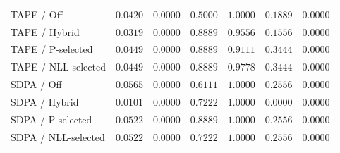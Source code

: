 \begin{table}[tb]
\begin{tabular}{l*{6}{r}}
\addlinespace[3pt]
TAPE / Off & $0.0420$ & $0.0000$ & $0.5000$ & $1.0000$ & $0.1889$ & $0.0000$ \\
TAPE / Hybrid & $0.0319$ & $0.0000$ & $0.8889$ & $0.9556$ & $0.1556$ & $0.0000$ \\
TAPE / P-selected & $0.0449$ & $0.0000$ & $0.8889$ & $0.9111$ & $0.3444$ & $0.0000$ \\
TAPE / NLL-selected & $0.0449$ & $0.0000$ & $0.8889$ & $0.9778$ & $0.3444$ & $0.0000$ \\
\addlinespace[3pt]
SDPA / Off & $0.0565$ & $0.0000$ & $0.6111$ & $1.0000$ & $0.2556$ & $0.0000$ \\
SDPA / Hybrid & $0.0101$ & $0.0000$ & $0.7222$ & $1.0000$ & $0.0000$ & $0.0000$ \\
SDPA / P-selected & $0.0522$ & $0.0000$ & $0.8889$ & $1.0000$ & $0.2556$ & $0.0000$ \\
SDPA / NLL-selected & $0.0522$ & $0.0000$ & $0.7222$ & $1.0000$ & $0.2556$ & $0.0000$ \\
\bottomrule
\end{tabular}
\end{table}
